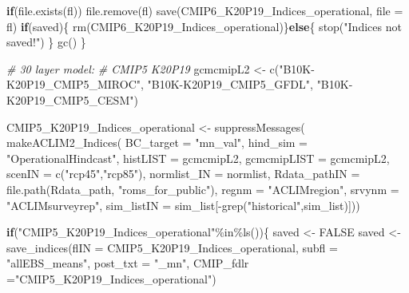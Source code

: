\documentclass[
]{article}
\newenvironment{Shaded}{\begin{snugshade}}{\end{snugshade}}
\newcommand{\AttributeTok}[1]{\textcolor[rgb]{0.77,0.63,0.00}{#1}}
\newcommand{\CommentTok}[1]{\textcolor[rgb]{0.56,0.35,0.01}{\textit{#1}}}
\newcommand{\ConstantTok}[1]{\textcolor[rgb]{0.00,0.00,0.00}{#1}}
\newcommand{\ControlFlowTok}[1]{\textcolor[rgb]{0.13,0.29,0.53}{\textbf{#1}}}
\newcommand{\FunctionTok}[1]{\textcolor[rgb]{0.00,0.00,0.00}{#1}}
\newcommand{\NormalTok}[1]{#1}
\newcommand{\OtherTok}[1]{\textcolor[rgb]{0.56,0.35,0.01}{#1}}
\newcommand{\SpecialCharTok}[1]{\textcolor[rgb]{0.00,0.00,0.00}{#1}}
\newcommand{\StringTok}[1]{\textcolor[rgb]{0.31,0.60,0.02}{#1}}
\begin{document}
\begin{Shaded}
\begin{Highlighting}[]
      \ControlFlowTok{if}\NormalTok{(}\FunctionTok{file.exists}\NormalTok{(fl)) }\FunctionTok{file.remove}\NormalTok{(fl)}
      \FunctionTok{save}\NormalTok{(CMIP6\_K20P19\_Indices\_operational, }\AttributeTok{file =}\NormalTok{ fl)}
       \ControlFlowTok{if}\NormalTok{(saved)\{}
        \FunctionTok{rm}\NormalTok{(CMIP6\_K20P19\_Indices\_operational)\}}\ControlFlowTok{else}\NormalTok{\{}
          \FunctionTok{stop}\NormalTok{(}\StringTok{"Indices not saved!"}\NormalTok{)}
\NormalTok{        \}}
      \FunctionTok{gc}\NormalTok{()}
\NormalTok{     \}}
     
    \CommentTok{\# 30 layer model:}
    \CommentTok{\# CMIP5 K20P19}
\NormalTok{    gcmcmipL2 }\OtherTok{\textless{}{-}} \FunctionTok{c}\NormalTok{(}\StringTok{"B10K{-}K20P19\_CMIP5\_MIROC"}\NormalTok{,}
                   \StringTok{"B10K{-}K20P19\_CMIP5\_GFDL"}\NormalTok{,}
                   \StringTok{"B10K{-}K20P19\_CMIP5\_CESM"}\NormalTok{)}
    
\NormalTok{    CMIP5\_K20P19\_Indices\_operational }\OtherTok{\textless{}{-}} \FunctionTok{suppressMessages}\NormalTok{(}
                        \FunctionTok{makeACLIM2\_Indices}\NormalTok{(}
                        \AttributeTok{BC\_target =} \StringTok{"mn\_val"}\NormalTok{,}
                        \AttributeTok{hind\_sim  =}  \StringTok{"OperationalHindcast"}\NormalTok{,}
                        \AttributeTok{histLIST  =}\NormalTok{ gcmcmipL2,}
                        \AttributeTok{gcmcmipLIST =}\NormalTok{ gcmcmipL2,}
                        \AttributeTok{scenIN    =} \FunctionTok{c}\NormalTok{(}\StringTok{"rcp45"}\NormalTok{,}\StringTok{"rcp85"}\NormalTok{),}
                        \AttributeTok{normlist\_IN =}\NormalTok{ normlist,}
                        \AttributeTok{Rdata\_pathIN =} \FunctionTok{file.path}\NormalTok{(Rdata\_path,}
                                                 \StringTok{"roms\_for\_public"}\NormalTok{),}
                        \AttributeTok{regnm    =} \StringTok{"ACLIMregion"}\NormalTok{,}
                        \AttributeTok{srvynm    =} \StringTok{"ACLIMsurveyrep"}\NormalTok{,}
                        \AttributeTok{sim\_listIN =}\NormalTok{ sim\_list[}\SpecialCharTok{{-}}\FunctionTok{grep}\NormalTok{(}\StringTok{"historical"}\NormalTok{,sim\_list)]))}
    
    \ControlFlowTok{if}\NormalTok{(}\StringTok{"CMIP5\_K20P19\_Indices\_operational"}\SpecialCharTok{\%in\%}\FunctionTok{ls}\NormalTok{())\{}
\NormalTok{      saved }\OtherTok{\textless{}{-}} \ConstantTok{FALSE}
\NormalTok{      saved }\OtherTok{\textless{}{-}} \FunctionTok{save\_indices}\NormalTok{(}\AttributeTok{flIN =}\NormalTok{ CMIP5\_K20P19\_Indices\_operational, }
                     \AttributeTok{subfl =} \StringTok{"allEBS\_means"}\NormalTok{,}
                     \AttributeTok{post\_txt =} \StringTok{"\_mn"}\NormalTok{,}
                     \AttributeTok{CMIP\_fdlr =}\StringTok{"CMIP5\_K20P19\_Indices\_operational"}\NormalTok{)}
        

\end{Highlighting}
\end{Shaded}
\end{document}
